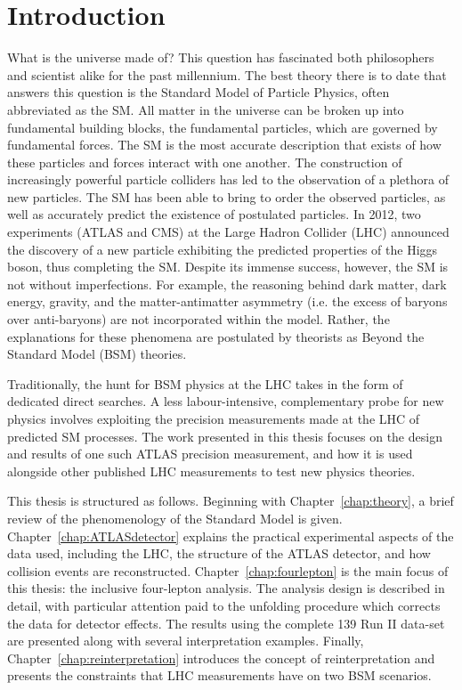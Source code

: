 \chapter{Introduction}
\label{chap:intro}
What is the universe made of? This question has fascinated both philosophers and scientist alike for the past millennium. The best theory there is to date that answers this question is the Standard Model of Particle Physics, often abbreviated as the SM. All matter in the universe can be broken up into fundamental building blocks, the fundamental particles, which are governed by fundamental forces. The SM is the most accurate description that exists of how these particles and forces interact with one another. The construction of increasingly powerful particle colliders has led to the observation of a plethora of new particles. The SM has been able to bring to order the observed particles, as well as accurately predict the existence of postulated particles. In 2012, two experiments (ATLAS and CMS) at the Large Hadron Collider (LHC) announced the discovery of a new particle exhibiting the predicted properties of the Higgs boson, thus completing the SM. Despite its immense success, however, the SM is not without imperfections. For example, the reasoning behind dark matter, dark energy, gravity, and the matter-antimatter asymmetry (i.e. the excess of baryons over anti-baryons) are not incorporated within the model. Rather, the explanations for these phenomena are postulated by theorists as Beyond the Standard Model (BSM) theories. 

Traditionally, the hunt for BSM physics at the LHC takes in the form of dedicated direct searches. A less labour-intensive, complementary probe for new physics involves exploiting the precision measurements made at the LHC of predicted SM processes. The work presented in this thesis focuses on the design and results of one such ATLAS precision measurement, and how it is used alongside other published LHC measurements to test new physics theories.

This thesis is structured as follows. Beginning with Chapter~\ref{chap:theory}, a brief review of the phenomenology of the Standard Model is given. Chapter~\ref{chap:ATLASdetector} explains the practical experimental aspects of the data used, including the LHC, the structure of the ATLAS detector, and how collision events are reconstructed. Chapter~\ref{chap:fourlepton} is the main focus of this thesis: the \ATLAS inclusive four-lepton analysis. The analysis design is described in detail, with particular attention paid to the unfolding procedure which corrects the data for detector effects. The results using the complete \unit{139}{\invfb} Run II data-set are presented along with several interpretation examples. Finally, Chapter~\ref{chap:reinterpretation} introduces the concept of reinterpretation and presents the constraints that LHC measurements have on two BSM scenarios. 

